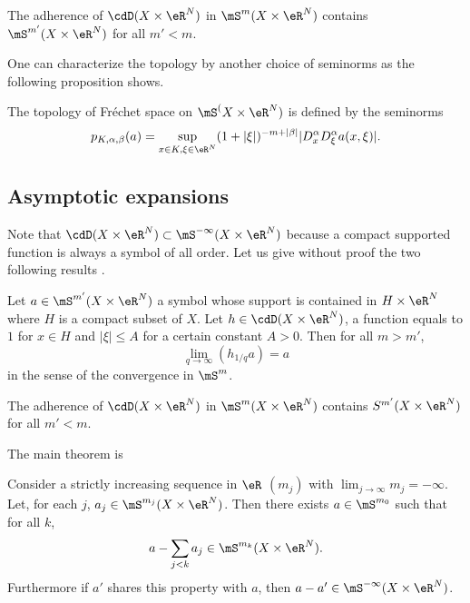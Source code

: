 \begin{lemma}
	The adherence of $\cdD(X\times\eR^N)$ in $\mS^m(X\times \eR^N)$ contains $\mS^{m'}(X\times\eR^N)$ for all $m'<m$.
	\label{lem:DadhS}
\end{lemma}

One can characterize the topology by another choice of seminorms as the following proposition shows.

\begin{proposition}
	The topology of Fréchet space on $\mS^(X\times\eR^N)$ is defined by the seminorms
	\[
		p_{K,\alpha,\beta}(a)=\sup_{x\in K,\xi\in\eR^N}(1+|\xi|)^{-m+|\beta|}| D_x^{\alpha}D_{\xi}^{\alpha}a(x,\xi) |.
	\]
	\label{prop:topo_alter}
\end{proposition}

\subsection{Asymptotic expansions}

Note that $\cdD(X\times \eR^N)\subset\mS^{-\infty}(X\times\eR^N)$ because a compact supported function is always a symbol of all order. Let us give without proof the two following results \cite{Dieu7}.


\begin{lemma}
	Let $a\in\mS^{m'}(X\times\eR^N)$ a symbol whose support is contained in $H\times\eR^N$ where $H$ is a compact subset of $X$. Let $h\in\cdD(X\times\eR^N)$, a function equals to $1$ for $x\in H$ and $|\xi|\leq A$ for a certain constant $A>0$. Then for all $m>m'$,
	\[
		\lim_{q\to\infty}(h_{1/q}a)=a
	\]
	in the sense of the convergence in $\mS^m$.
	\label{lem:limha}
\end{lemma}

\begin{proposition}
	The adherence of $\cdD(X\times\eR^N)$ in $\mS^m(X\times\eR^N)$ contains $S^{m'}(X\times\eR^N)$ for all $m'<m$.
\end{proposition}

The main theorem is

\begin{theorem}
	Consider a strictly increasing sequence in $\eR$ $(m_j)$ with $\lim_{j\to\infty}m_j=-\infty$. Let, for each $j$, $a_j\in\mS^{m_j}(X\times\eR^N)$. Then there exists $a\in \mS^{m_0}$ such that for all $k$,
	\begin{equation}  \label{eq:dev_ass}
		a-\sum_{j<k}a_j\in\mS^{m_k}(X\times\eR^N).
	\end{equation}
	Furthermore if $a'$ shares this property with $a$, then $a-a'\in\mS^{-\infty}(X\times\eR^N)$.
	\label{tho:dev_ass}
\end{theorem}


